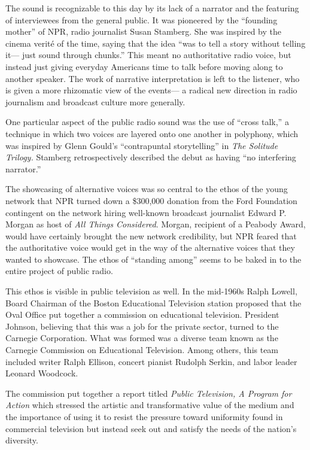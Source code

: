 \documentclass[12pt,letterpaper]{article}
\begin{document}
	The sound is recognizable to this day by its lack of a 
	narrator and the featuring of interviewees from the general public. It 
	was pioneered by the ``founding mother'' of NPR, radio 
	journalist Susan Stamberg. She was inspired by the cinema verité of the
	time, saying that the idea ``was to tell a story without telling it---
	just sound through chunks.'' This meant no authoritative radio voice,
	but instead just giving everyday Americans time to talk before moving 
	along to another speaker. The work of narrative interpretation is left
	to the listener, who is given a more rhizomatic view of the events---
	a radical new direction in radio journalism and broadcast culture more
	generally.  

	One particular aspect of the public radio sound was the use of ``cross
	talk,'' a technique in which two voices are layered onto one another 	
	in polyphony, which was inspired by Glenn Gould's ``contrapuntal 
	storytelling'' in \textit{The Solitude Trilogy.}\autocite[197]{Porter}
	Stamberg retrospectively described the debut as having ``no interfering 
	narrator.''\autocite[185]{Porter}

	The showcasing of alternative voices was so central to the ethos of the
	young network that NPR turned down a \$300,000 donation from 
	the Ford 
	Foundation contingent on the network hiring well-known broadcast
	journalist Edward P. Morgan as host of \textit{All Things Considered}. 
	Morgan, recipient of a Peabody Award, would have certainly 
	brought the new network
	credibility, but NPR feared that the authoritative voice would
	get in the way of the alternative voices that they wanted to showcase.
	The ethos of ``standing among'' seems to be baked in to the entire
	project of public radio.

	This ethos is visible in public television as well. In the mid-1960s
	Ralph Lowell, Board Chairman of the Boston Educational Television 
	station proposed that the Oval Office put together a commission on 
	educational television. President Johnson, believing that this was
	a job for the private sector, turned to the Carnegie Corporation.
	What was formed was a diverse team known as the Carnegie Commission
	on Educational Television. Among others, this team included writer Ralph
	Ellison, concert pianist Rudolph Serkin, and labor leader Leonard 
	Woodcock.\autocite[409]{Meany}

	The commission put together a report titled \textit{Public Television, A 
	Program for Action} which stressed the artistic and transformative value
	of the medium and the importance of using it to resist the pressure 
	toward uniformity found in commercial television but instead seek out 
	and satisfy the needs of the nation's diversity.\autocite[410]{Meany}
\end{document}
